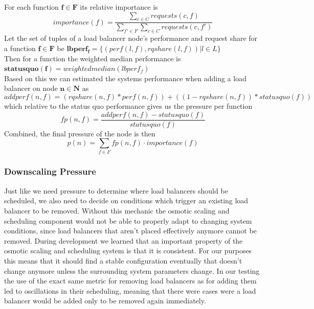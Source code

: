 For each function $\mathbf{f \in F}$ its relative importance is
\[importance(f) = \frac{\sum_{c \in C}requests(c,f)}{\sum_{f' \in F}\sum_{c \in C}requests(c,f')} \]
Let the set of tuples of a load balancer node's performance and request share for a function $\mathbf{f \in F}$ be $\mathbf{lbperf_{f}} = \{(perf(l,f), rqshare(l,f)) | l \in L\}$\\
Then for a function the weighted median performance is $\mathbf{statusquo(f)} = weightedmedian(lbperf_{f})$\\
Based on this we can estimated the systems performance when adding a load balancer on node $\mathbf{n \in N}$ as
\[ addperf(n,f) = (rqshare(n,f) * perf(n,f)) + ((1 - rqshare(n,f)) * statusquo(f))\]
which relative to the status quo performance gives us the pressure per function
\[ fp(n, f) = \frac{addperf(n,f) - statusquo(f)}{statusquo(f)}\]
Combined, the final pressure of the node is then
\[p(n) = \sum_{f \in F}fp(n,f) \cdot importance(f)\]

\subsubsection{Downscaling Pressure}
Just like we need pressure to determine where load balancers should be scheduled, we also need to decide on conditions which trigger an existing load balancer to be removed.
Without this mechanic the osmotic scaling and scheduling component would not be able to properly adapt to changing system conditions, since load balancers that aren't placed effectively anymore cannot be removed.
During development we learned that an important property of the osmotic scaling and scheduling system is that it is consistent.
For our purposes this means that it should find a stable configuration eventually that doesn't change anymore unless the surrounding system parameters change.
In our testing the use of the exact same metric for removing load balancers as for adding them led to oscillations in their scheduling, meaning that there were cases were a load balancer would be added only to be removed again immediately.

